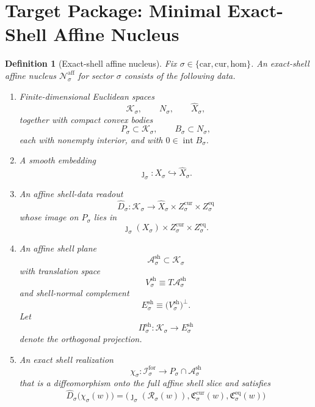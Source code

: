 \documentclass[11pt]{article}
\newcommand{\Car}{\mathrm{car}}
\newcommand{\Cur}{\mathrm{cur}}
\newcommand{\Hom}{\mathrm{hom}}
\newcommand{\ForSpace}[1]{\mathcal I_{#1}^{\mathrm{for}}}
\newcommand{\Reduction}[1]{\mathcal R_{#1}}
\newcommand{\CurrentCarrier}[1]{\mathfrak C_{#1}^{\mathrm{cur}}}
\newcommand{\EqCarrier}[1]{\mathfrak C_{#1}^{\mathrm{eq}}}
\newcommand{\VisibleAffine}[1]{\widehat X_{#1}}
\newcommand{\CoordSpace}[1]{\mathcal K_{#1}}
\newcommand{\CoordBody}[1]{P_{#1}}
\newcommand{\NormalSpace}[1]{N_{#1}}
\newcommand{\NormalBody}[1]{B_{#1}}
\newcommand{\AffineData}[1]{\widehat D_{#1}}
\newcommand{\ShellAffine}[1]{\mathcal A_{#1}^{\mathrm{sh}}}
\newcommand{\ShellDir}[1]{V_{#1}^{\mathrm{sh}}}
\newcommand{\ShellNormal}[1]{E_{#1}^{\mathrm{sh}}}
\newcommand{\ShellProj}[1]{\Pi_{#1}^{\mathrm{sh}}}
\newcommand{\ShellEmbed}[1]{\chi_{#1}}
\newcommand{\AffineNucleus}[1]{\mathcal N_{#1}^{\mathrm{aff}}}
\newtheorem{definition}{Definition}
\begin{document}
\section{Target Package: Minimal Exact-Shell Affine Nucleus}

\begin{definition}[Exact-shell affine nucleus]
\label{def:nucleus}
Fix \(\sigma\in\{\Car,\Cur,\Hom\}\). An \emph{exact-shell affine nucleus} \(\AffineNucleus{\sigma}\) for sector \(\sigma\) consists of the following data.
\begin{enumerate}
    \item Finite-dimensional Euclidean spaces
    \[
    \CoordSpace{\sigma},
    \qquad
    \NormalSpace{\sigma},
    \qquad
    \VisibleAffine{\sigma},
    \]
    together with compact convex bodies
    \[
    \CoordBody{\sigma}\subset\CoordSpace{\sigma},
    \qquad
    \NormalBody{\sigma}\subset\NormalSpace{\sigma},
    \]
    each with nonempty interior, and with \(0\in\operatorname{int}\NormalBody{\sigma}\).
    \item A smooth embedding
    \[
    \jmath_{\sigma}:X_{\sigma}\hookrightarrow \VisibleAffine{\sigma}.
    \]
    \item An affine shell-data readout
    \[
    \AffineData{\sigma}:\CoordSpace{\sigma}\to
    \VisibleAffine{\sigma}\times Z_{\sigma}^{\mathrm{cur}}\times Z_{\sigma}^{\mathrm{eq}}
    \]
    whose image on \(\CoordBody{\sigma}\) lies in
    \[
    \jmath_{\sigma}(X_{\sigma})\times Z_{\sigma}^{\mathrm{cur}}\times Z_{\sigma}^{\mathrm{eq}}.
    \]
    \item An affine shell plane
    \[
    \ShellAffine{\sigma}\subset\CoordSpace{\sigma}
    \]
    with translation space
    \[
    \ShellDir{\sigma}\equiv T\ShellAffine{\sigma}
    \]
    and shell-normal complement
    \[
    \ShellNormal{\sigma}\equiv\bigl(\ShellDir{\sigma}\bigr)^{\perp}.
    \]
    Let
    \[
    \ShellProj{\sigma}:\CoordSpace{\sigma}\to\ShellNormal{\sigma}
    \]
    denote the orthogonal projection.
    \item An exact shell realization
    \[
    \ShellEmbed{\sigma}:\ForSpace{\sigma}\to
    \CoordBody{\sigma}\cap \ShellAffine{\sigma}
    \]
    that is a diffeomorphism onto the full affine shell slice and satisfies
    \begin{equation}
    \AffineData{\sigma}\bigl(\ShellEmbed{\sigma}(w)\bigr)
    =
    \bigl(
    \jmath_{\sigma}(\Reduction{\sigma}(w)),
    \CurrentCarrier{\sigma}(w),
    \EqCarrier{\sigma}(w)
    \bigr)
    \label{eq:nucleuscompat}
    \end{equation}

\end{enumerate}
\end{definition}
\end{document}
